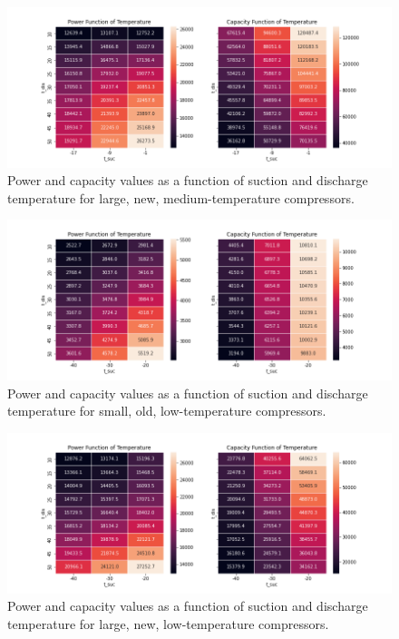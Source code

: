 \begin{figure}
    \centering \includegraphics[width=1.0\textwidth]{figures/refrigeration_MTnew.png}
    \caption[Compressor performance for large, new, medium temperature compressors]{Power and capacity values as a function of suction and discharge temperature for large, new, medium-temperature compressors.}
    \label{fig:refrig_mt_new}
\end{figure}

\begin{figure}
    \centering \includegraphics[width=1.0\textwidth]{figures/refrigeration_LTold.png}
    \caption[Compressor performance for small, old, low temperature compressors]{Power and capacity values as a function of suction and discharge temperature for small, old, low-temperature compressors.}
    \label{fig:refrig_lt_old}
\end{figure}

\begin{figure}
    \centering \includegraphics[width=1.0\textwidth]{figures/refrigeration_LTnew.png}
    \caption[Compressor performance for large, new, low temperature compressors]{Power and capacity values as a function of suction and discharge temperature for large, new, low-temperature compressors.}
    \label{fig:refrig_lt_new}
\end{figure}

